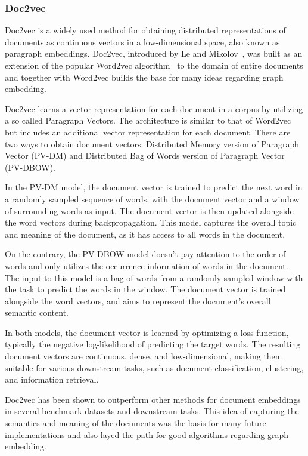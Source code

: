 \subsubsection{Doc2vec}
Doc2vec is a widely used method for obtaining distributed representations of documents as continuous vectors in a low-dimensional space, also known as paragraph embeddings. Doc2vec, introduced by Le and Mikolov~\cite{2014doc2vec}, was built as an extension of the popular Word2vec algorithm~\cite{mikolov2013distributed} to the domain of entire documents and together with Word2vec builds the base for many ideas regarding graph embedding.

Doc2vec learns a vector representation for each document in a corpus by utilizing a so called Paragraph Vectors. The architecture is similar to that of Word2vec but includes an additional vector representation for each document. There are two ways to obtain document vectors: Distributed Memory version of Paragraph Vector (PV-DM) and Distributed Bag of Words version of Paragraph Vector (PV-DBOW).

In the PV-DM model, the document vector is trained to predict the next word in a randomly sampled sequence of words, with the document vector and a window of surrounding words as input. The document vector is then updated alongside the word vectors during backpropagation. This model captures the overall topic and meaning of the document, as it has access to all words in the document.

On the contrary, the PV-DBOW model doesn't pay attention to the order of words and only utilizes the occurrence information of words in the document. The input to this model is a bag of words from a randomly sampled window with the task to predict the words in the window. The document vector is trained alongside the word vectors, and  aims to represent the document's overall semantic content.

In both models, the document vector is learned by optimizing a loss function, typically the negative log-likelihood of predicting the target words. The resulting document vectors are continuous, dense, and low-dimensional, making them suitable for various downstream tasks, such as document classification, clustering, and information retrieval.

Doc2vec has been shown to outperform other methods for document embeddings in several benchmark datasets and downstream tasks. This idea of capturing the semantics and meaning of the documents was the basis for many future implementations and also layed the path for good algorithms regarding graph embedding.


